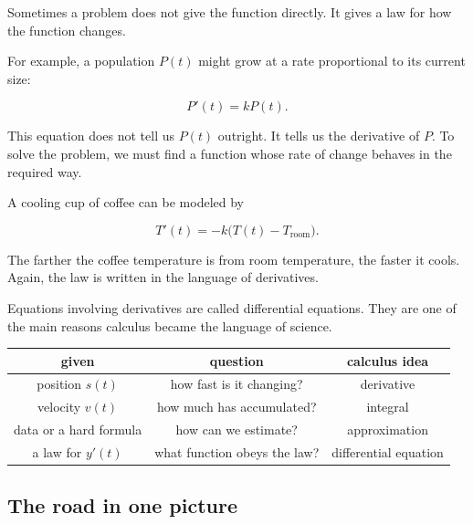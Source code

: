 Sometimes a problem does not give the function directly. It gives a law for how the function changes.

For example, a population \(P(t)\) might grow at a rate proportional to its current size:

\[
P'(t)=kP(t).
\]

This equation does not tell us \(P(t)\) outright. It tells us the derivative of \(P\). To solve the problem, we must find a function whose rate of change behaves in the required way.

A cooling cup of coffee can be modeled by

\[
T'(t)=-k\bigl(T(t)-T_{\text{room}}\bigr).
\]

The farther the coffee temperature is from room temperature, the faster it cools. Again, the law is written in the language of derivatives.

Equations involving derivatives are called differential equations. They are one of the main reasons calculus became the language of science.

\begin{center}
\begin{tabular}{c|c|c}
\textbf{given} & \textbf{question} & \textbf{calculus idea} \\ \hline
position \(s(t)\) & how fast is it changing? & derivative \\
velocity \(v(t)\) & how much has accumulated? & integral \\
data or a hard formula & how can we estimate? & approximation \\
a law for \(y'(t)\) & what function obeys the law? & differential equation
\end{tabular}
\end{center}

\subsection{The road in one picture}

